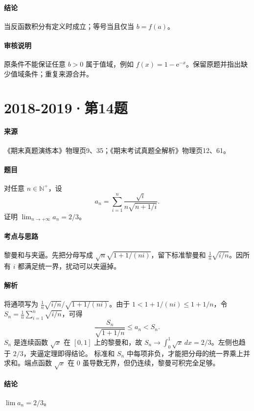 \documentclass[UTF8,fontset=fandol,12pt,oneside,openany]{ctexrep}
\newcommand{\N}{\mathbb N^{+}}
\newcommand{\ee}{\mathrm e}
\theoremstyle{definition}
\begin{document}
\paragraph{结论}
当反函数积分有定义时成立；等号当且仅当 $b=f(a)$。
\paragraph{审核说明}
原条件不能保证任意 $b>0$ 属于值域，例如 $f(x)=1-\ee^{-x}$。保留原题并指出缺少值域条件；重复来源合并。

\par\addvspace{18pt}\noindent\begin{minipage}{\linewidth}
\section{2018-2019·第14题}
\label{exam:11:q22}
\paragraph{来源} 《期末真题演练本》物理页9、35；《期末考试真题全解析》物理页12、61。
\paragraph{题目}
对任意 $n\in\N$，设
\[a_n=\sum_{i=1}^{n}\frac{\sqrt i}{n\sqrt{n+1/i}}.\]
证明 $\lim_{n\to+\infty}a_n=2/3$。
\end{minipage}\par
\paragraph{考点与思路}
黎曼和与夹逼。先把分母写成 $\sqrt n\sqrt{1+1/(ni)}$，留下标准黎曼和 $\frac1n\sqrt{i/n}$。因所有 $i$ 都满足统一界，扰动可以夹逼掉。
\paragraph{解析}
将通项写为 $\frac1n\sqrt{i/n}/\sqrt{1+1/(ni)}$。由于 $1<1+1/(ni)\le1+1/n$，令 $S_n=\frac1n\sum_{i=1}^n\sqrt{i/n}$，可得
\[\frac{S_n}{\sqrt{1+1/n}}\le a_n<S_n.\]
$S_n$ 是连续函数 $\sqrt x$ 在 $[0,1]$ 上的黎曼和，故 $S_n\to\int_0^1\sqrt x\,dx=2/3$。左侧也趋于 $2/3$，夹逼定理即得结论。
标准和 $S_n$ 中每项非负，才能把分母的统一界乘上并求和。端点函数 $\sqrt{x}$ 在 $0$ 虽导数无界，但仍连续，黎曼可积完全足够。
\paragraph{结论}
$\lim a_n=2/3$。
\end{document}
